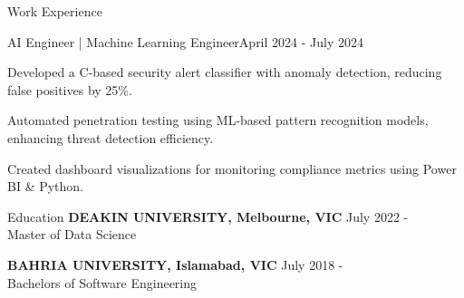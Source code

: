 \documentclass{resume} %
\begin{document}
    \begin{rSection}{Work Experience}
                    \begin{rSubsection}
                {AI Engineer | Machine Learning Engineer}{April 2024 - July 2024}
                                    {}
                                {}
                                    \item Developed a C{-}based security alert classifier with anomaly detection, reducing false positives by 25\%.
                                    \item Automated penetration testing using ML{-}based pattern recognition models, enhancing threat detection efficiency.
                                    \item Created dashboard visualizations for monitoring compliance metrics using Power BI \& Python.
                            \end{rSubsection}
            \end{rSection}

\begin{rSection}{Education}
                        \textbf{DEAKIN UNIVERSITY, Melbourne, VIC} \hfill {July 2022 - } \\
                            {Master of Data Science}
                         
             
         
                        \textbf{BAHRIA UNIVERSITY, Islamabad, VIC} \hfill {July 2018 - } \\
                            {Bachelors of Software Engineering}
                         
             
         
    \end{rSection}
\end{document}
